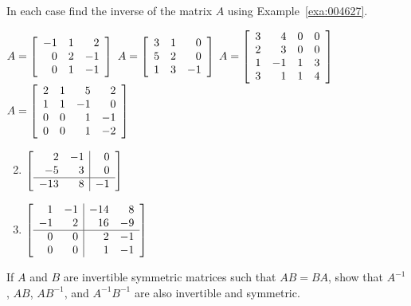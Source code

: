 \begin{multicols}{2}
\begin{ex}
In each case find the inverse of the matrix $A$ using Example~\ref{exa:004627}.
\begin{exenumerate}
\exitem $A = \left[ \begin{array}{rrr}
-1 & 1 & 2 \\
0 & 2 & -1 \\
0 & 1 & -1
\end{array} \right]$
\exitem $A = \left[ \begin{array}{rrr}
3 & 1 & 0 \\
5 & 2 & 0 \\
1 & 3 & -1
\end{array} \right]$
\exitem* $A = \left[ \begin{array}{rrrr}
3 & 4 & 0 & 0 \\
2 & 3 & 0 & 0 \\
1 & -1 & 1 & 3 \\
3 & 1 & 1 & 4 
\end{array} \right]$
\exitem* $A = \left[ \begin{array}{rrrr}
2 & 1 & 5 & 2 \\
1 & 1 & -1 & 0 \\
0 & 0 & 1 & -1 \\
0 & 0 & 1 & -2 
\end{array} \right]$
\end{exenumerate}
\begin{sol}
\begin{enumerate}[label={\alph*.}]
\setcounter{enumi}{1}
\item $\left[ \begin{array}{rr|r}
2 & -1 & 0 \\
-5 & 3 & 0 \\
\hline
-13 & 8 & -1
\end{array} \right]$

\setcounter{enumi}{3}
\item $\left[ \begin{array}{rr|rr}
1 & -1 & -14 & 8 \\
-1 & 2 & 16 & -9 \\
\hline
0 & 0 & 2 & -1 \\
0 & 0 & 1 & -1
\end{array} \right]$

\end{enumerate}
\end{sol}
\end{ex}

\begin{ex}
If $A$ and $B$ are invertible symmetric matrices such that $AB = BA$, show that $A^{-1}$, $AB$, $AB^{-1}$, and $A^{-1}B^{-1}$ are also invertible and symmetric.
\end{ex}


\end{multicols}
